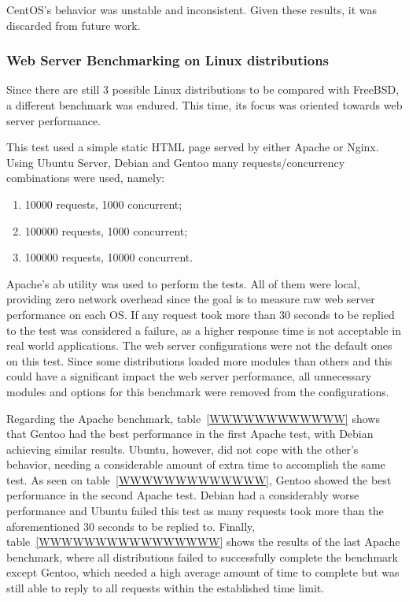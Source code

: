 CentOS's behavior was unstable and inconsistent. Given these results, it was discarded from future work.

\subsubsection{Web Server Benchmarking on Linux distributions}
Since there are still 3 possible Linux distributions to be compared with FreeBSD, a different benchmark was endured. This time, its focus was oriented towards web server performance.

This test used a simple static HTML page served by either Apache or Nginx. Using Ubuntu Server, Debian and Gentoo many requests/concurrency combinations were used, namely:
\begin{enumerate}
  \item 10000 requests, 1000 concurrent;
  \item 100000 requests, 1000 concurrent;
  \item 100000 requests, 10000 concurrent.
\end{enumerate}
Apache's ab utility was used to perform the tests. All of them were local, providing zero network overhead since the goal is to measure raw web server performance on each OS. If any request took more than 30 seconds to be replied to the test was considered a failure, as a higher response time is not acceptable in real world applications. The web server configurations were not the default ones on this test. Since some distributions loaded more modules than others and this could have a significant impact the web server performance, all unnecessary modules and options for this benchmark were removed from the configurations.

Regarding the Apache benchmark, table~\ref{WWWWWWWWWWWW} shows that Gentoo had the best performance in the first Apache test, with Debian achieving similar results. Ubuntu, however, did not cope with the other's behavior, needing a considerable amount of extra time to accomplish the same test. As seen on table~\ref{WWWWWWWWWWWWW}, Gentoo showed the best performance in the second Apache test. Debian had a considerably worse performance and Ubuntu failed this test as many requests took more than the aforementioned 30 seconds to be replied to. Finally, table~\ref{WWWWWWWWWWWWWWWW} shows the results of the last Apache benchmark, where all distributions failed to successfully complete the benchmark except Gentoo, which needed a high average amount of time to complete but was still able to reply to all requests within the established time limit.

